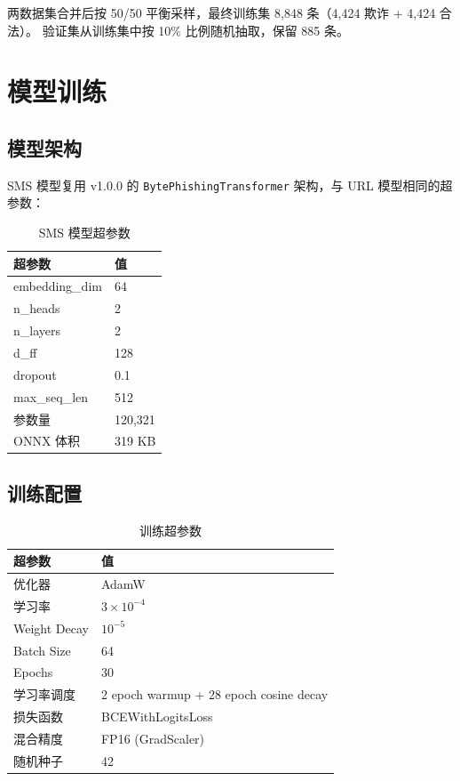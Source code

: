 \documentclass[11pt,a4paper]{article}
\begin{document}
两数据集合并后按 50/50 平衡采样，最终训练集 8,848 条（4,424 欺诈 + 4,424 合法）。
验证集从训练集中按 10\% 比例随机抽取，保留 885 条。

\section{模型训练}

\subsection{模型架构}

SMS 模型复用 v1.0.0 的 \texttt{BytePhishingTransformer} 架构，与 URL 模型相同的超参数：

\begin{table}[H]
\centering
\caption{SMS 模型超参数}
\begin{tabular}{ll}
\toprule
超参数 & 值 \\
\midrule
embedding\_dim & 64 \\
n\_heads & 2 \\
n\_layers & 2 \\
d\_ff & 128 \\
dropout & 0.1 \\
max\_seq\_len & 512 \\
参数量 & 120,321 \\
ONNX 体积 & 319 KB \\
\bottomrule
\end{tabular}
\end{table}

\subsection{训练配置}

\begin{table}[H]
\centering
\caption{训练超参数}
\begin{tabular}{ll}
\toprule
超参数 & 值 \\
\midrule
优化器 & AdamW \\
学习率 & $3 \times 10^{-4}$ \\
Weight Decay & $10^{-5}$ \\
Batch Size & 64 \\
Epochs & 30 \\
学习率调度 & 2 epoch warmup + 28 epoch cosine decay \\
损失函数 & BCEWithLogitsLoss \\
混合精度 & FP16 (GradScaler) \\
随机种子 & 42 \\
\bottomrule
\end{tabular}
\end{table}
\end{document}
